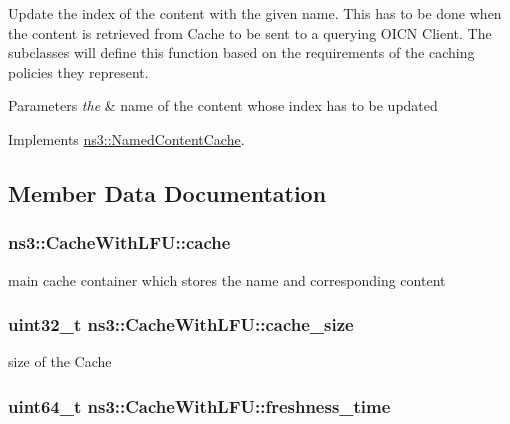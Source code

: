 Update the index of the content with the given name. This has to be done when the content is retrieved from Cache to be sent to a querying O\-I\-C\-N Client. The subclasses will define this function based on the requirements of the caching policies they represent. 


\begin{DoxyParams}{Parameters}
{\em the} & name of the content whose index has to be updated \\
\hline
\end{DoxyParams}


Implements \hyperlink{classns3_1_1NamedContentCache_aeabf8afacd89cbc46b78b382c8a487e8}{ns3\-::\-Named\-Content\-Cache}.



\subsection{Member Data Documentation}
\hypertarget{classns3_1_1CacheWithLFU_a8ab1e97d5de9b643e4b29f80e971294b}{
\subsubsection[{cache}]{ ns3\-::\-Cache\-With\-L\-F\-U\-::cache\hspace{0.3cm}{\ttfamily [private]}}}\label{classns3_1_1CacheWithLFU_a8ab1e97d5de9b643e4b29f80e971294b}


main cache container which stores the name and corresponding content 

\hypertarget{classns3_1_1CacheWithLFU_a79d5772bfd23f574af448f95c223417c}{
\subsubsection[{cache\-\_\-size}]{\setlength{\rightskip}{0pt plus 5cm}uint32\-\_\-t ns3\-::\-Cache\-With\-L\-F\-U\-::cache\-\_\-size\hspace{0.3cm}{\ttfamily [private]}}}\label{classns3_1_1CacheWithLFU_a79d5772bfd23f574af448f95c223417c}


size of the Cache 

\hypertarget{classns3_1_1CacheWithLFU_a8301a27e2e133723a181782ed791c3b0}{
\subsubsection[{freshness\-\_\-time}]{\setlength{\rightskip}{0pt plus 5cm}uint64\-\_\-t ns3\-::\-Cache\-With\-L\-F\-U\-::freshness\-\_\-time\hspace{0.3cm}{\ttfamily [private]}}}\label{classns3_1_1CacheWithLFU_a8301a27e2e133723a181782ed791c3b0}


